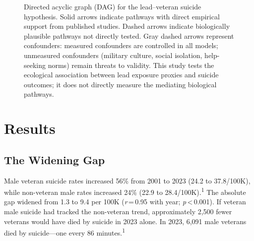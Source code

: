 \documentclass[11pt,twocolumn]{article}
\begin{document}
\begin{figure}[t]
\caption{Directed acyclic graph (DAG) for the lead--veteran suicide hypothesis. Solid arrows indicate pathways with direct empirical support from published studies. Dashed arrows indicate biologically plausible pathways not directly tested. Gray dashed arrows represent confounders: measured confounders are controlled in all models; unmeasured confounders (military culture, social isolation, help-seeking norms) remain threats to validity. This study tests the ecological association between lead exposure proxies and suicide outcomes; it does not directly measure the mediating biological pathways.}
\label{fig:dag}
\end{figure}


\section{Results}

\subsection{The Widening Gap}

Male veteran suicide rates increased 56\% from 2001 to 2023 (24.2 to 37.8/100K), while non-veteran male rates increased 24\% (22.9 to 28.4/100K).\textsuperscript{1} The absolute gap widened from 1.3 to 9.4 per 100K (\textit{r}\,=\,0.95 with year; \textit{p}\,<\,0.001). If veteran male suicide had tracked the non-veteran trend, approximately 2,500 fewer veterans would have died by suicide in 2023 alone. In 2023, 6,091 male veterans died by suicide---one every 86 minutes.\textsuperscript{1}
\end{document}
